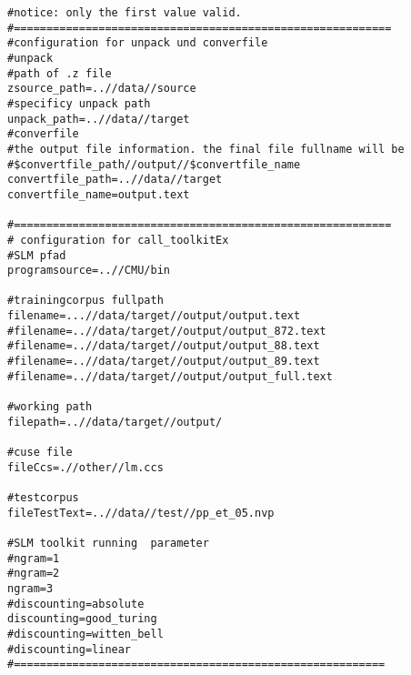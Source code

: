 \begin{lstlisting}
#notice: only the first value valid.
#==========================================================
#configuration for unpack und converfile
#unpack
#path of .z file 
zsource_path=..//data//source
#specificy unpack path
unpack_path=..//data//target
#converfile
#the output file information. the final file fullname will be
#$convertfile_path//output//$convertfile_name
convertfile_path=..//data//target
convertfile_name=output.text

#==========================================================
# configuration for call_toolkitEx
#SLM pfad
programsource=..//CMU/bin

#trainingcorpus fullpath
filename=...//data/target//output/output.text
#filename=..//data/target//output/output_872.text
#filename=..//data/target//output/output_88.text
#filename=..//data/target//output/output_89.text
#filename=..//data/target//output/output_full.text

#working path
filepath=..//data/target//output/

#cuse file
fileCcs=.//other//lm.ccs

#testcorpus
fileTestText=..//data//test//pp_et_05.nvp

#SLM toolkit running  parameter
#ngram=1
#ngram=2
ngram=3
#discounting=absolute
discounting=good_turing
#discounting=witten_bell
#discounting=linear
#=========================================================

\end{lstlisting}
